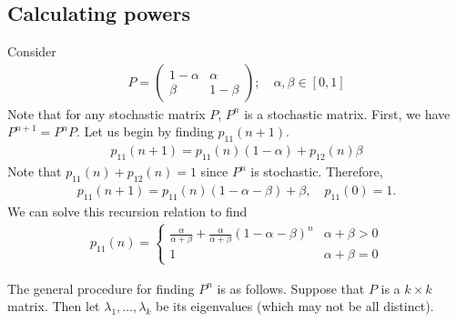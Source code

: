\subsection{Calculating powers}
\begin{example}
	Consider
	\begin{align*}
		P = \begin{pmatrix}
			1-\alpha & \alpha \\ \beta & 1-\beta
		\end{pmatrix};\quad \alpha, \beta \in [0,1]
	\end{align*}
	Note that for any stochastic matrix $P$, $P^n$ is a stochastic matrix.
	First, we have $P^{n+1} = P^n P$.
	Let us begin by finding $p_{11}(n+1)$.
	\begin{align*}
		p_{11}(n+1) = p_{11}(n)(1-\alpha) + p_{12}(n)\beta
	\end{align*}
	Note that $p_{11}(n) + p_{12}(n) = 1$ since $P^n$ is stochastic.
	Therefore,
	\begin{align*}
		p_{11}(n+1) = p_{11}(n)(1-\alpha-\beta) + \beta,\quad p_{11}(0) = 1.
	\end{align*}
	We can solve this recursion relation to find
	\begin{align*}
		p_{11}(n) = \begin{cases}
			\frac{\alpha}{\alpha + \beta} + \frac{\alpha}{\alpha + \beta}(1-\alpha-\beta)^n & \alpha + \beta > 0 \\
			1                                                                               & \alpha + \beta = 0\end{cases}
	\end{align*}
\end{example}
\noindent The general procedure for finding $P^n$ is as follows.
Suppose that $P$ is a $k \times k$ matrix.
Then let $\lambda_1, \dots, \lambda_k$ be its eigenvalues (which may not be all distinct).
